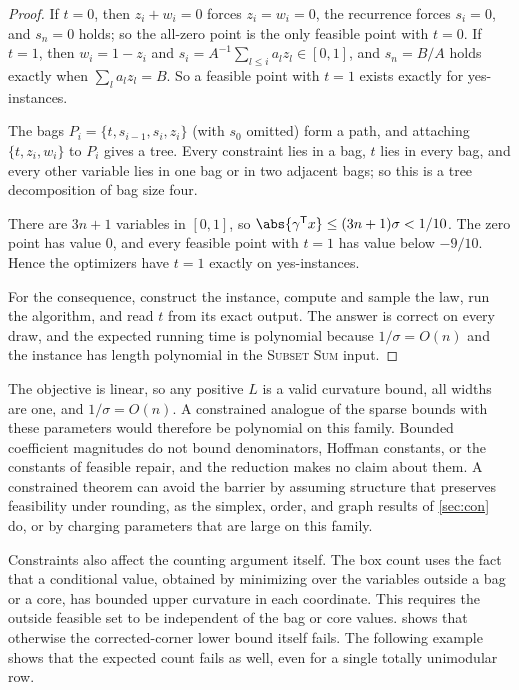 \begin{proof}
If $t=0$, then $z_i+w_i=0$ forces $z_i=w_i=0$, the recurrence forces
$s_i=0$, and $s_n=0$ holds; so the all-zero point is the only feasible
point with $t=0$. If $t=1$, then $w_i=1-z_i$ and
$s_i=A^{-1}\sum_{l\le i}a_lz_l\in[0,1]$, and $s_n=B/A$ holds exactly when
$\sum_la_lz_l=B$. So a feasible point with $t=1$ exists exactly for
yes-instances.

The bags $P_i=\{t,s_{i-1},s_i,z_i\}$ (with $s_0$ omitted) form a path, and
attaching $\{t,z_i,w_i\}$ to $P_i$ gives a tree. Every constraint lies in a
bag, $t$ lies in every bag, and every other variable lies in one bag or in
two adjacent bags; so this is a tree decomposition of bag size four.

There are $3n+1$ variables in $[0,1]$, so
$\abs{\gamma^{\mathsf T}x}\le(3n+1)\sigma<1/10$. The zero point has value
$0$, and every feasible point with $t=1$ has value below $-9/10$. Hence the
optimizers have $t=1$ exactly on yes-instances.

For the consequence, construct the instance, compute and sample the law,
run the algorithm, and read $t$ from its exact output. The answer is
correct on every draw, and the expected running time is polynomial because
$1/\sigma=O(n)$ and the instance has length polynomial in the
\textsc{Subset Sum} input.
\end{proof}

The objective is linear, so any positive $L$ is a valid curvature bound, all
widths are one, and $1/\sigma=O(n)$. A constrained analogue of the sparse
bounds with these parameters would therefore be polynomial on this family.
Bounded coefficient magnitudes do not bound denominators, Hoffman constants,
or the constants of feasible repair, and the reduction makes no claim about
them. A constrained theorem can avoid the barrier by assuming structure
that preserves feasibility under rounding, as the simplex, order, and graph
results of \cref{sec:con} do, or by charging parameters that are large on
this family.

Constraints also affect the counting argument itself. The box count uses
the fact that a conditional value, obtained by minimizing over the variables
outside a bag or a core, has bounded upper curvature in each coordinate.
This requires the outside feasible set to be independent of the bag or core
values.  shows that otherwise the corrected-corner
lower bound itself fails. The following example shows that the expected
count fails as well, even for a single totally unimodular row.


